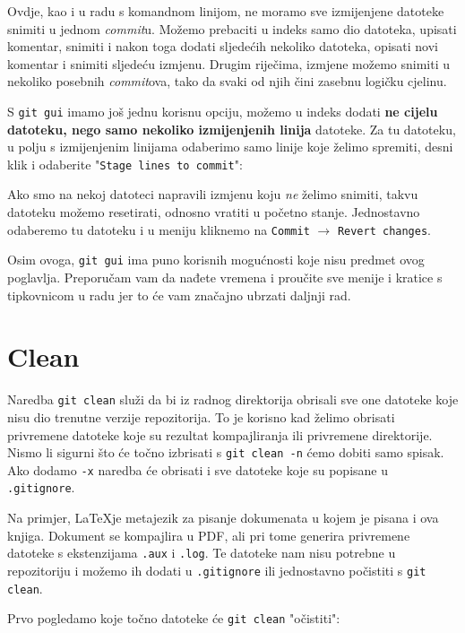 Ovdje, kao i u radu s komandnom linijom, ne moramo sve izmijenjene datoteke snimiti u jednom \emph{commit}u. 
Možemo prebaciti u indeks samo dio datoteka, upisati komentar, snimiti i nakon toga dodati sljedećih nekoliko datoteka, opisati novi komentar i snimiti sljedeću izmjenu.
Drugim riječima, izmjene možemo snimiti u nekoliko posebnih \emph{commit}ova, tako da svaki od njih čini zasebnu logičku cjelinu.

S \verb+git gui+ imamo još jednu korisnu opciju, možemo u indeks dodati \textbf{ne cijelu datoteku, nego samo nekoliko izmijenjenih linija} datoteke.
Za tu datoteku, u polju s izmijenjenim linijama odaberimo samo linije koje želimo spremiti, desni klik i odaberite "\verb+Stage lines to commit+":


Ako smo na nekoj datoteci napravili izmjenu koju \emph{ne} želimo snimiti, takvu datoteku možemo resetirati, odnosno vratiti u početno stanje. 
Jednostavno odaberemo tu datoteku i u meniju kliknemo na \verb+Commit+ $\rightarrow$ \verb+Revert changes+.

Osim ovoga, \verb+git gui+ ima puno korisnih mogućnosti koje nisu predmet ovog poglavlja.
Preporučam vam da nađete vremena i proučite sve menije i kratice s tipkovnicom u radu jer to će vam značajno ubrzati daljnji rad.

\section*{Clean}

Naredba \verb+git clean+ služi da bi iz radnog direktorija obrisali sve one datoteke koje nisu dio trenutne verzije repozitorija.
To je korisno kad želimo obrisati privremene datoteke koje su rezultat kompajliranja ili privremene direktorije.
Nismo li sigurni što će točno izbrisati s \verb+git clean -n+ ćemo dobiti samo spisak.
Ako dodamo \verb+-x+ naredba će obrisati i sve datoteke koje su popisane u \verb+.gitignore+.

Na primjer, \LaTeX je metajezik za pisanje dokumenata u kojem je pisana i ova knjiga.
Dokument se kompajlira u PDF, ali pri tome generira privremene datoteke s ekstenzijama \verb+.aux+ i \verb+.log+.
Te datoteke nam nisu potrebne u repozitoriju i možemo ih dodati u \verb+.gitignore+ ili jednostavno počistiti s \verb+git clean+.

Prvo pogledamo koje točno datoteke će \verb+git clean+ "očistiti":


